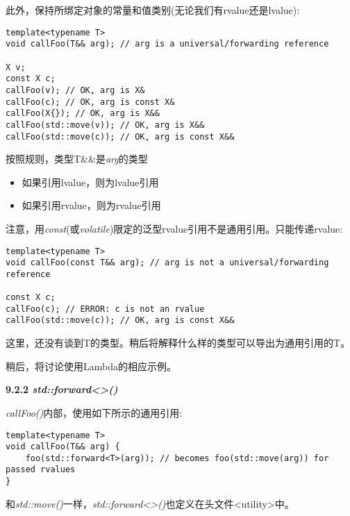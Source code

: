 此外，保持所绑定对象的常量和值类别(无论我们有rvalue还是lvalue):\par

\begin{lstlisting}[caption={}]
template<typename T>
void callFoo(T&& arg); // arg is a universal/forwarding reference

X v;
const X c;
callFoo(v); // OK, arg is X&
callFoo(c); // OK, arg is const X&
callFoo(X{}); // OK, arg is X&&
callFoo(std::move(v)); // OK, arg is X&&
callFoo(std::move(c)); // OK, arg is const X&&
\end{lstlisting}

按照规则，类型T\&\&是\textit{arg}的类型\par

\begin{itemize}
	\item 如果引用lvalue，则为lvalue引用
	\item 如果引用rvalue，则为rvalue引用
\end{itemize}

注意，用\textit{const}(或\textit{volatile})限定的泛型rvalue引用不是通用引用。只能传递rvalue:\par

\begin{lstlisting}[caption={}]
template<typename T>
void callFoo(const T&& arg); // arg is not a universal/forwarding reference

const X c;
callFoo(c); // ERROR: c is not an rvalue
callFoo(std::move(c)); // OK, arg is const X&&
\end{lstlisting}

这里，还没有谈到T的类型。稍后将解释什么样的类型可以导出为通用引用的T。\par

稍后，将讨论使用Lambda的相应示例。\par

\hspace*{\fill} \par %
\textbf{9.2.2 \textit{std::forward<>()}}

\textit{callFoo()}内部，使用如下所示的通用引用:\par

\begin{lstlisting}[caption={}]
template<typename T>
void callFoo(T&& arg) {
	foo(std::forward<T>(arg)); // becomes foo(std::move(arg)) for passed rvalues
}
\end{lstlisting}

和\textit{std::move()}一样，\textit{std::forward<>()}也定义在头文件<utility>中。\par

